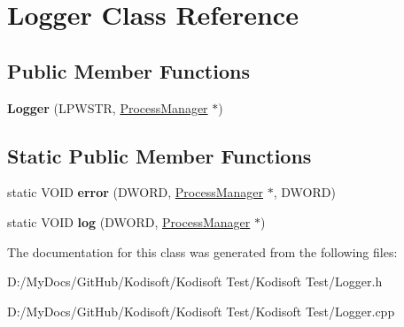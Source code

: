 \hypertarget{class_logger}{\section{Logger Class Reference}
\label{class_logger}
}
\subsection*{Public Member Functions}
\begin{DoxyCompactItemize}
\item 
\hypertarget{class_logger_ad5976c5d766dc98681afeee715bfc9db}{{\bfseries Logger} (L\+P\+W\+S\+T\+R, \hyperlink{class_process_manager}{Process\+Manager} $\ast$)}\label{class_logger_ad5976c5d766dc98681afeee715bfc9db}

\end{DoxyCompactItemize}
\subsection*{Static Public Member Functions}
\begin{DoxyCompactItemize}
\item 
\hypertarget{class_logger_a4a18f512e2d977a9bcb98af5d56db1d1}{static V\+O\+I\+D {\bfseries error} (D\+W\+O\+R\+D, \hyperlink{class_process_manager}{Process\+Manager} $\ast$, D\+W\+O\+R\+D)}\label{class_logger_a4a18f512e2d977a9bcb98af5d56db1d1}

\item 
\hypertarget{class_logger_ae246b48011da71bcd9f734a367e7646e}{static V\+O\+I\+D {\bfseries log} (D\+W\+O\+R\+D, \hyperlink{class_process_manager}{Process\+Manager} $\ast$)}\label{class_logger_ae246b48011da71bcd9f734a367e7646e}

\end{DoxyCompactItemize}


The documentation for this class was generated from the following files\+:\begin{DoxyCompactItemize}
\item 
D\+:/\+My\+Docs/\+Git\+Hub/\+Kodisoft/\+Kodisoft Test/\+Kodisoft Test/Logger.\+h\item 
D\+:/\+My\+Docs/\+Git\+Hub/\+Kodisoft/\+Kodisoft Test/\+Kodisoft Test/Logger.\+cpp\end{DoxyCompactItemize}
